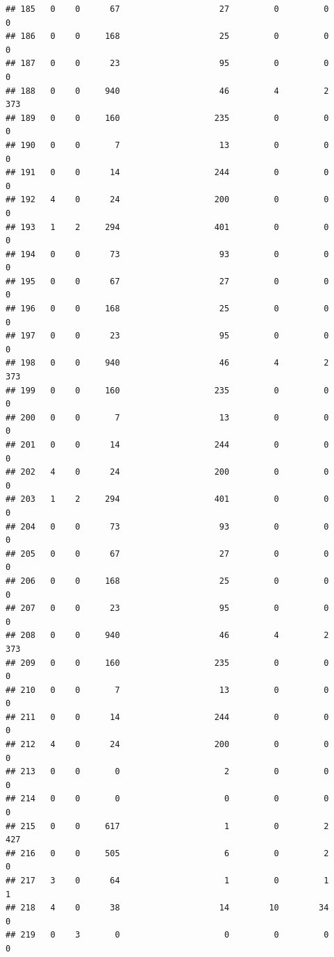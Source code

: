 \documentclass[
]{article}
\begin{document}
\begin{verbatim}
## 185   0    0      67                    27         0         0        0
## 186   0    0     168                    25         0         0        0
## 187   0    0      23                    95         0         0        0
## 188   0    0     940                    46         4         2      373
## 189   0    0     160                   235         0         0        0
## 190   0    0       7                    13         0         0        0
## 191   0    0      14                   244         0         0        0
## 192   4    0      24                   200         0         0        0
## 193   1    2     294                   401         0         0        0
## 194   0    0      73                    93         0         0        0
## 195   0    0      67                    27         0         0        0
## 196   0    0     168                    25         0         0        0
## 197   0    0      23                    95         0         0        0
## 198   0    0     940                    46         4         2      373
## 199   0    0     160                   235         0         0        0
## 200   0    0       7                    13         0         0        0
## 201   0    0      14                   244         0         0        0
## 202   4    0      24                   200         0         0        0
## 203   1    2     294                   401         0         0        0
## 204   0    0      73                    93         0         0        0
## 205   0    0      67                    27         0         0        0
## 206   0    0     168                    25         0         0        0
## 207   0    0      23                    95         0         0        0
## 208   0    0     940                    46         4         2      373
## 209   0    0     160                   235         0         0        0
## 210   0    0       7                    13         0         0        0
## 211   0    0      14                   244         0         0        0
## 212   4    0      24                   200         0         0        0
## 213   0    0       0                     2         0         0        0
## 214   0    0       0                     0         0         0        0
## 215   0    0     617                     1         0         2      427
## 216   0    0     505                     6         0         2        0
## 217   3    0      64                     1         0         1        1
## 218   4    0      38                    14        10        34        0
## 219   0    3       0                     0         0         0        0

\end{verbatim}
\end{document}
